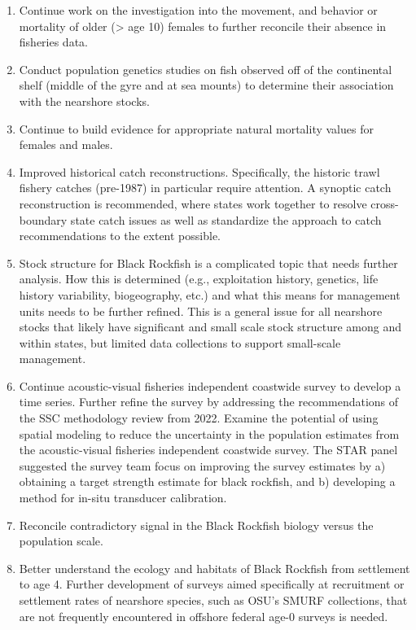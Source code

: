 \documentclass[11pt,
  letterpaper,
]{article}
\providecommand{\tightlist}{%
  \setlength{\itemsep}{0pt}\setlength{\parskip}{0pt}}
\providecommand{\tightlist}{%
  \setlength{\itemsep}{0pt}\setlength{\parskip}{0pt}}
\begin{document}
\begin{enumerate}
\def\labelenumi{\arabic{enumi}.}
\tightlist
\item
  Continue work on the investigation into the movement, and behavior or mortality of older (\textgreater{} age 10) females to further reconcile their absence in fisheries data.
\item
  Conduct population genetics studies on fish observed off of the continental shelf (middle of the gyre and at sea mounts) to determine their association with the nearshore stocks.
\item
  Continue to build evidence for appropriate natural mortality values for females and males.
\item
  Improved historical catch reconstructions. Specifically, the historic trawl fishery catches (pre-1987) in particular require attention. A synoptic catch reconstruction is recommended, where states work together to resolve cross-boundary state catch issues as well as standardize the approach to catch recommendations to the extent possible.
\item
  Stock structure for Black Rockfish is a complicated topic that needs further analysis. How this is determined (e.g., exploitation history, genetics, life history variability, biogeography, etc.) and what this means for management units needs to be further refined. This is a general issue for all nearshore stocks that likely have significant and small scale stock structure among and within states, but limited data collections to support small-scale management.
\item
  Continue acoustic-visual fisheries independent coastwide survey to develop a time series. Further refine the survey by addressing the recommendations of the SSC methodology review from 2022. Examine the potential of using spatial modeling to reduce the uncertainty in the population estimates from the acoustic-visual fisheries independent coastwide survey. The STAR panel suggested the survey team focus on improving the survey estimates by a) obtaining a target strength estimate for black rockfish, and b) developing a method for in-situ transducer calibration.
\item
  Reconcile contradictory signal in the Black Rockfish biology versus the population scale.
\item
  Better understand the ecology and habitats of Black Rockfish from settlement to age 4. Further development of surveys aimed specifically at recruitment or settlement rates of nearshore species, such as OSU's SMURF collections, that are not frequently encountered in offshore federal age-0 surveys is needed.

\end{enumerate}
\end{document}
